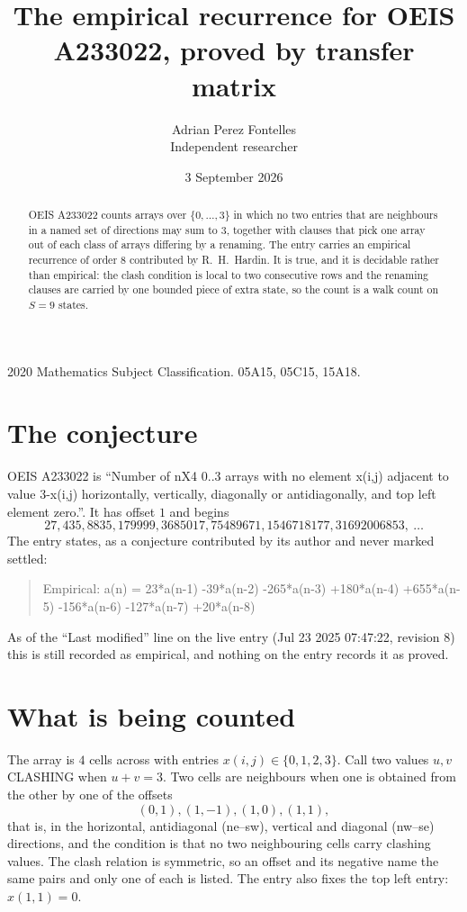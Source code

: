 \documentclass[11pt,a4paper]{article}
\title{The empirical recurrence for OEIS A233022, proved by transfer matrix}
\author{Adrian Perez Fontelles\\ \small Independent researcher}
\date{3 September 2026}
\theoremstyle{plain}
\theoremstyle{definition}
\begin{document}
\maketitle

\begin{abstract}
OEIS A233022 counts arrays over $\{0,\dots,3\}$ in which no two entries that are neighbours in
a named set of directions may sum to $3$, together with clauses that pick one array out of
each class of arrays differing by a renaming. The entry carries an empirical recurrence of
order $8$ contributed by R.~H.~Hardin. It is true, and it is decidable rather than
empirical: the clash condition is local to two consecutive rows and the renaming clauses are
carried by one bounded piece of extra state, so the count is a walk count on $S=9$ states.
\end{abstract}

\noindent\small 2020 Mathematics Subject Classification. 05A15, 05C15, 15A18.\normalsize

\section{The conjecture}

OEIS A233022 is ``Number of nX4 0..3 arrays with no element x(i,j) adjacent to value 3-x(i,j) horizontally, vertically, diagonally or antidiagonally, and top left element zero.''. It has offset $1$ and begins
\[
27, 435, 8835, 179999, 3685017, 75489671, 1546718177, 31692006853,\ \dots
\]
The entry states, as a conjecture contributed by its author and never marked settled:
\begin{quote}
Empirical: a(n) = 23*a(n-1) -39*a(n-2) -265*a(n-3) +180*a(n-4) +655*a(n-5) -156*a(n-6) -127*a(n-7) +20*a(n-8)
\end{quote}
As of the ``Last modified'' line on the live entry (Jul 23 2025 07:47:22, revision 8) this is still
recorded as empirical, and nothing on the entry records it as proved.

\section{What is being counted}

The array is $4$ cells across with entries $x(i,j)\in\{0,1,2,3\}$. Call two values $u,v$ CLASHING
when $u+v=3$. Two cells are neighbours when one is obtained from the other by one of
the offsets
\[
(0,1), (1,-1), (1,0), (1,1),
\]
that is, in the horizontal, antidiagonal (ne--sw), vertical and diagonal (nw--se) directions, and the condition is that no two neighbouring cells carry
clashing values. The clash relation is symmetric, so an offset and its negative name the
same pairs and only one of each is listed. The entry also fixes the top left entry: $x(1,1)=0$.
\end{document}
